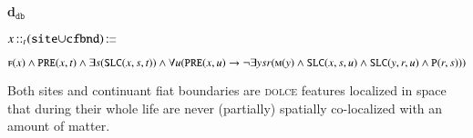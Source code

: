 \documentclass[ao]{iosart2x}
\newcommand{\bfoAxLabel}{\textrm{a$_\texttt{b}$}}
\newcommand{\dbDefLabel}{\textrm{d$_\texttt{db}$}}
\newcounter{cntdbdf}
\newcommand{\dbdf}[1]{\refstepcounter{cntdbdf}\begin{small}{\bf \dbDefLabel\thecntdbdf\label{#1}}\end{small}}
\newcommand{\refbfoax}[1]{({\bfoAxLabel}\ref{#1})}
\newcommand{\refdbdf}[1]{({\dbDefLabel}\ref{#1})}
\newcommand{\pr}[1]{\mathtt{#1}}
\newcommand{\cn}[1]{\mathtt{#1}}
\newcommand\textequal{%
 \rule[.08ex]{5pt}{0.35pt}\llap{\rule[.78ex]{5pt}{0.35pt}}}
\newcommand{\sdef}{{\hspace{1.5pt}:\hspace{-2.5pt}\textequal\hspace{3pt}}}
\newcommand{\dolce}{{\textsc{dolce}}}
\newcommand{\bfo}{{\textsc{bfo}}}
\newcommand {\APOdcat} {\textsc{apo}}
\newcommand {\Mdcat} {\textsc{m}}
\newcommand {\ASdcat} {\textsc{as}}
\newcommand {\EDdcat} {\textsc{ed}}
\newcommand {\Fdcat} {\textsc{f}}
\newcommand {\MOBdcat} {\textsc{mob}}
\newcommand {\NPOBdcat} {\textsc{npob}}
\newcommand {\PEDdcat} {\textsc{ped}}
\newcommand {\TPd} {\ensuremath{\pr{tP}}}
\newcommand {\Pd} {\ensuremath{\pr{P}}}
\newcommand {\ATd} {\ensuremath{\pr{AT}}}
\newcommand {\PREd} {\ensuremath{\pr{PRE}}}
\newcommand {\SDd} {\ensuremath{\pr{SD}}}
\newcommand {\Kd} {\ensuremath{\pr{K}}}
\newcommand {\EXDd} {\ensuremath{\pr{EXD}}}
\newcommand {\SLCd} {\ensuremath{\pr{SLC}}}
\newcommand{\idcntbcat}{\cn{idcnt}}
\newcommand{\sdcntbcat}{\cn{sdcnt}}
\newcommand{\mtenbcat}{\cn{mten}}
\newcommand{\sitebcat}{\cn{site}}
\newcommand{\cfbndbcat}{\cn{cfbnd}}
\newcommand{\bfoiof}[1]{{\,::_{#1\:\!}}}
\begin{document}
%
%
%
%
%
%
%

\item[\dbdf{d2b_siteUcfbnd}] $x \bfoiof{t} (\sitebcat{\cup}\cfbndbcat) \sdef $\parbox[t]{\textwidth}{$\Fdcat(x) \land \PREd(x,t) \land \exists s(\SLCd(x,s,t)) \land \\ 
\forall u(\PREd(x,u) \to \neg\exists ysr(\Mdcat(y) \land \SLCd(x,s,u) \land \SLCd(y,r,u) \land \Pd(r,s)))$}

\vspace{1pt}
Both sites and continuant fiat boundaries are {\dolce} features localized in space that during their whole life are never (partially) spatially co-localized with an amount of matter.
\end{document}
